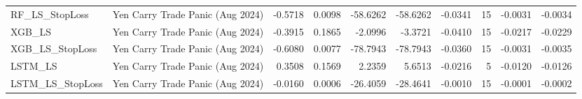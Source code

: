 \begin{tabular}{llrrrrrrrr}
\cline{1-10}
RF\_LS\_StopLoss & Yen Carry Trade Panic (Aug 2024) & -0.5718 & 0.0098 & -58.6262 & -58.6262 & -0.0341 & 15 & -0.0031 & -0.0034 \\
\cline{1-10}
XGB\_LS & Yen Carry Trade Panic (Aug 2024) & -0.3915 & 0.1865 & -2.0996 & -3.3721 & -0.0410 & 15 & -0.0217 & -0.0229 \\
\cline{1-10}
XGB\_LS\_StopLoss & Yen Carry Trade Panic (Aug 2024) & -0.6080 & 0.0077 & -78.7943 & -78.7943 & -0.0360 & 15 & -0.0031 & -0.0035 \\
\cline{1-10}
LSTM\_LS & Yen Carry Trade Panic (Aug 2024) & 0.3508 & 0.1569 & 2.2359 & 5.6513 & -0.0216 & 5 & -0.0120 & -0.0126 \\
\cline{1-10}
LSTM\_LS\_StopLoss & Yen Carry Trade Panic (Aug 2024) & -0.0160 & 0.0006 & -26.4059 & -28.4641 & -0.0010 & 15 & -0.0001 & -0.0002 \\
\cline{1-10}
\bottomrule
\end{tabular}
